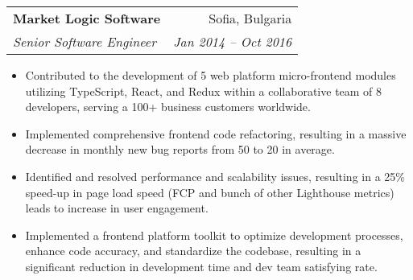 \documentclass[letterpaper,11pt]{article}
\makeatletter
\newif\ifrussian
\newcommand{\text}[2]{%
  \ifrussian#2\else#1\fi%
}
\newcommand{\resumeItem}[1]{
  \item\small{
    {#1 \vspace{-2pt}}
  }
}
\newcommand{\resumeSubheading}[4]{
  \vspace{-1pt}\item
    \begin{tabular*}{0.97\textwidth}[t]{l@{\extracolsep{\fill}}r}
      \textbf{#1} & #2 \\
      \textit{\small#3} & \textit{\small #4} \\
    \end{tabular*}\vspace{-5pt}
}
\newcommand{\resumeItemListStart}{\begin{itemize}}
\newcommand{\resumeItemListEnd}{\end{itemize}\vspace{-5pt}}
\makeatother
\begin{document}
\resumeSubheading
{\text
  {Market Logic Software}
  {Market Logic Software}}
{\text
  {Sofia, Bulgaria}
  {София, Болгария}}
{\text
  {Senior Software Engineer}
  {Старший разработчик}}
{\text
  {Jan 2014 -- Oct 2016}
  {Янв. 2014 -- Окт. 2016}}
\resumeItemListStart
\resumeItem
{\text
  {Contributed to the development of 5 web platform micro-frontend modules utilizing TypeScript, React, and Redux within a collaborative team of 8 developers, serving a 100+ business customers worldwide.}
  {Внес вклад в разработку 5 микро-фронтендов веб-платформы, используя TypeScript, React и Redux в команде из 8 разработчиков, обслуживающих 100+ клиентов в бизнесе.}}
\resumeItem
{\text
  {Implemented comprehensive frontend code refactoring, resulting in a massive decrease in monthly new bug reports from 50 to 20 in average.}
  {Реализовал комплексную рефакторизацию фронтенда, что привело к значительному сокращению ежемесячного количества новых багов с 50 до 20.}}
\resumeItem
{\text
  {Identified and resolved performance and scalability issues, resulting in a 25\% speed-up in page load speed (FCP and bunch of other Lighthouse metrics) leads to increase in user engagement.}
  {Определил и решил проблемы с производительностью и масштабируемостью, что привело к увеличению скорости загрузки страницы на 25\% (FCP и другие метрики Lighthouse) и увеличению пользовательской активности.}}
\resumeItem
{\text
  {Implemented a frontend platform toolkit to optimize development processes, enhance code accuracy, and standardize the codebase, resulting in a significant reduction in development time and dev team satisfying rate.}
  {Реализовал инструмент для оптимизации процессов разработки, повышения точности кода и стандартизации кода, что привело к значительному сокращению времени разработки и удовлетворенности команды разработчиков.}}
\resumeItemListEnd
\end{document}
